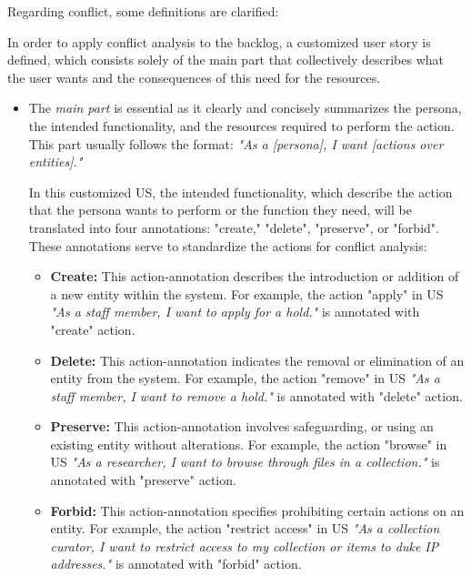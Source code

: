Regarding conflict, some definitions are clarified:
\begin{definition}
	In order to apply conflict analysis to the backlog, a customized user story is defined, which consists solely of the main part that collectively describes what the user wants and the consequences of this need for the resources.
\begin{itemize}
	\item The \textit{main part} is essential as it clearly and concisely summarizes the persona, the intended functionality, and the resources required to perform the action. This part usually follows the format: \textit{"As a [persona], I want [actions over entities]."}
	
	In this customized US, the intended functionality, which describe the action that the persona wants to perform or the function they need, will be translated into four annotations: "create," "delete", "preserve", or "forbid". These annotations serve to standardize the actions for conflict analysis:
	
	\begin{itemize}
		\item \textbf{Create:} This action-annotation describes the introduction or addition of a new entity within the system. For example, the action "apply" in US \textit{"As a staff member, I want to apply for a hold."} is annotated with "create" action.
		
		\item \textbf{Delete:} This action-annotation indicates the removal or elimination of an entity from the system. For example, the action "remove" in US \textit{"As a staff member, I want to remove a hold."} is annotated with "delete" action.
		
		\item \textbf{Preserve:} This action-annotation involves safeguarding, or using an existing entity without alterations. For example, the action "browse" in US \textit{"As a researcher, I want to browse through files in a collection."} is annotated with "preserve" action.
		
		\item \textbf{Forbid:} This action-annotation specifies prohibiting certain actions on an entity. For example, the action "restrict access" in US \textit{"As a collection curator, I want to restrict access to my collection or items to duke IP addresses."} is annotated with "forbid" action.
	\end{itemize}
	

\end{itemize}
\end{definition}
